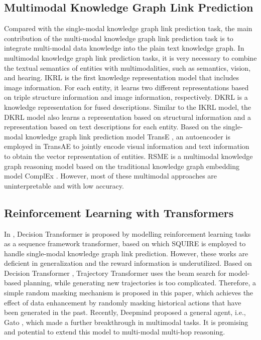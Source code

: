 \documentclass[10pt,journal,compsoc]{IEEEtran}
\begin{document}
\subsection{Multimodal Knowledge Graph Link Prediction}
Compared with the single-modal knowledge graph link prediction task, the main contribution of the multi-modal knowledge graph link prediction task is to integrate multi-modal data knowledge into the plain text knowledge graph. In multimodal knowledge graph link prediction tasks, it is very necessary to combine the textual semantics of entities with multimodalities, such as semantics, vision, and hearing. IKRL \cite{ref37} is the first knowledge representation model that includes image information. For each entity, it learns two different representations based on triple structure information and image information, respectively. DKRL \cite{ref38} is a knowledge representation for fused descriptions. Similar to the IKRL model, the DKRL model also learns a representation based on structural information and a representation based on text descriptions for each entity. Based on the single-modal knowledge graph link prediction model TransE \cite{ref1}, an autoencoder is employed in TransAE \cite{ref14} to jointly encode visual information and text information to obtain the vector representation of entities. RSME \cite{ref15} is a multimodal knowledge graph reasoning model based on the traditional knowledge graph embedding model ComplEx \cite{ref16}. However, most of these multimodal approaches are uninterpretable and with low accuracy. \par

\subsection{Reinforcement Learning with Transformers}
In \cite{ref17}, Decision Transformer is proposed by modelling reinforcement learning tasks as a sequence framework transformer, based on which SQUIRE \cite{ref19} is employed to handle single-modal knowledge graph link prediction. However, these works are deficient in generalization and the reward information is underutilized. Based on Decision Transformer \cite{ref17}, Trajectory Transformer \cite{ref46} uses the beam search for model-based planning, while generating new trajectories is too complicated. Therefore, a simple random masking mechanism is proposed in this paper, which achieves the effect of data enhancement by randomly masking historical actions that have been generated in the past. Recently, Deepmind proposed a general agent, i.e., Gato \cite{ref18}, which made a further breakthrough in multimodal tasks. It is promising and potential to extend this model to multi-modal multi-hop reasoning.\par
\end{document}
